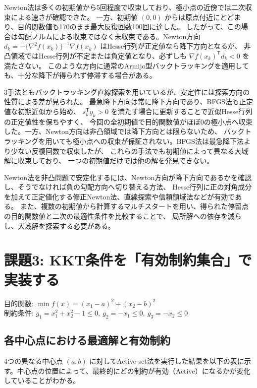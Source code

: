 \documentclass[11pt,a4paper]{ltjsarticle}
\begin{document}
Newton法は多くの初期値から5回程度で収束しており、極小点の近傍では二次収束による速さが確認できた。
一方、初期値 $(0,0)$ からは原点付近にとどまり、目的関数値も170のまま最大反復回数100回に達した。
したがって、この場合は勾配ノルムによる収束ではなく未収束である。Newton方向
$d_k=-\{\nabla^2 f(x_k)\}^{-1}\nabla f(x_k)$ はHesse行列が正定値なら降下方向となるが、
非凸領域ではHesse行列が不定または負定値となり、必ずしも $\nabla f(x_k)^{\mathsf T}d_k<0$ を満たさない。
このような方向に通常のArmijo型バックトラッキングを適用しても、十分な降下が得られず停滞する場合がある。

3手法ともバックトラッキング直線探索を用いているが、安定性には探索方向の性質による差が見られた。
最急降下方向は常に降下方向であり、BFGS法も正定値な初期近似から始め、
$s_k^{\mathsf T}y_k>0$ を満たす場合に更新することで近似Hesse行列の正定値性を保ちやすく、
今回の全初期値で目的関数値がほぼ0の極小点へ収束した。一方、Newton方向は非凸領域では降下方向とは限らないため、
バックトラッキングを用いても極小点への収束が保証されない。BFGS法は最急降下法より少ない反復回数で収束したが、
これらの手法でも初期値によって異なる大域解に収束しており、
一つの初期値だけでは他の解を発見できない。

Newton法を非凸問題で安定化するには、Newton方向が降下方向であるかを確認し、そうでなければ負の勾配方向へ切り替える方法、
Hesse行列に正の対角成分を加えて正定値化する修正Newton法、直線探索や信頼領域法などが有効である。
また、複数の初期値から計算するマルチスタートを用い、得られた停留点の目的関数値と二次の最適性条件を比較することで、
局所解への依存を減らし、大域解を探索する必要がある。

\section{課題3: KKT条件を「有効制約集合」で実装する}
目的関数: $\min f(x)=(x_{1}-a)^{2}+(x_{2}-b)^{2}$ \\
制約条件: $g_{1}=x_{1}^{2}+x_{2}^{2}-1 \le 0,\ g_{2}=-x_{1} \le 0,\ g_{3}=-x_{2} \le 0$

\subsection{各中心点における最適解と有効制約}
4つの異なる中心点 $(a,b)$ に対してActive-set法を実行した結果を以下の表に示す。中心点の位置によって、最終的にどの制約が有効（Active）になるかが変化していることがわかる。
\end{document}
